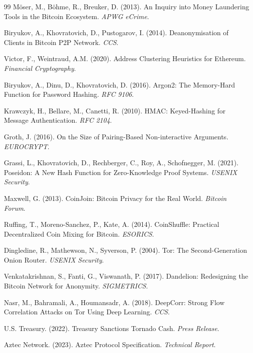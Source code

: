 \documentclass[11pt]{article}
\theoremstyle{definition}
\theoremstyle{plain}
\theoremstyle{remark}
\begin{document}
\begin{thebibliography}{99}
M\"{o}ser, M., B\"{o}hme, R., Breuker, D. (2013). An Inquiry into Money Laundering Tools in the Bitcoin Ecosystem. \textit{APWG eCrime}.

Biryukov, A., Khovratovich, D., Pustogarov, I. (2014). Deanonymisation of Clients in Bitcoin P2P Network. \textit{CCS}.

Victor, F., Weintraud, A.M. (2020). Address Clustering Heuristics for Ethereum. \textit{Financial Cryptography}.

Biryukov, A., Dinu, D., Khovratovich, D. (2016). Argon2: The Memory-Hard Function for Password Hashing. \textit{RFC 9106}.

Krawczyk, H., Bellare, M., Canetti, R. (2010). HMAC: Keyed-Hashing for Message Authentication. \textit{RFC 2104}.

Groth, J. (2016). On the Size of Pairing-Based Non-interactive Arguments. \textit{EUROCRYPT}.

Grassi, L., Khovratovich, D., Rechberger, C., Roy, A., Schofnegger, M. (2021). Poseidon: A New Hash Function for Zero-Knowledge Proof Systems. \textit{USENIX Security}.

Maxwell, G. (2013). CoinJoin: Bitcoin Privacy for the Real World. \textit{Bitcoin Forum}.

Ruffing, T., Moreno-Sanchez, P., Kate, A. (2014). CoinShuffle: Practical Decentralized Coin Mixing for Bitcoin. \textit{ESORICS}.

Dingledine, R., Mathewson, N., Syverson, P. (2004). Tor: The Second-Generation Onion Router. \textit{USENIX Security}.

Venkatakrishnan, S., Fanti, G., Viswanath, P. (2017). Dandelion: Redesigning the Bitcoin Network for Anonymity. \textit{SIGMETRICS}.

Nasr, M., Bahramali, A., Houmansadr, A. (2018). DeepCorr: Strong Flow Correlation Attacks on Tor Using Deep Learning. \textit{CCS}.

U.S. Treasury. (2022). Treasury Sanctions Tornado Cash. \textit{Press Release}.

Aztec Network. (2023). Aztec Protocol Specification. \textit{Technical Report}.


\end{thebibliography}
\end{document}
